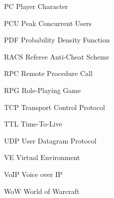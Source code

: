 \begin{Nomencl}[\gnat]
        \item[PC]       Player Character
        \item[PCU]      Peak Concurrent Users
        \item[PDF]      Probability Density Function
        \item[RACS]     Referee Anti-Cheat Scheme
        \item[RPC]      Remote Procedure Call
        \item[RPG]      Role-Playing Game
        \item[TCP]      Transport Control Protocol
        \item[TTL]      Time-To-Live
        \item[UDP]      User Datagram Protocol
        \item[VE]       Virtual Environment
        \item[VoIP]     Voice over IP
        \item[WoW]      World of Warcraft
\end{Nomencl}
\endinput
